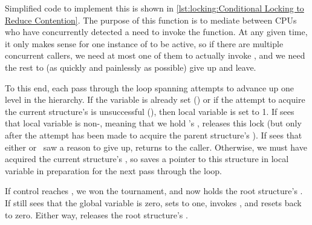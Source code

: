 Simplified code to implement this is shown in
\cref{lst:locking:Conditional Locking to Reduce Contention}.
The purpose of this function is to mediate between CPUs who have concurrently
detected a need to invoke the  function.
At any given time, it only makes sense for one instance of
 to be active, so if there are multiple
concurrent callers, we need at most one of them to actually invoke
, and we need the rest to (as quickly and
painlessly as possible) give up and leave.

\begin{fcvref}
To this end, each pass through the loop spanning  attempts
to advance up one level in the  hierarchy.
If the  variable is already set () or if the attempt
to acquire the current  structure's  is
unsuccessful (), then local variable  is set to 1.
If  sees that local variable  is non-,
meaning that we hold 's ,
 releases this lock (but only after the attempt has been made
to acquire the parent  structure's ).
If  sees that either  or~
saw a reason to give up,
 returns to the caller.
Otherwise, we must have acquired the current  structure's
, so  saves a pointer to this structure in local
variable  in preparation for the next pass through the loop.

If control reaches , we won the tournament, and now holds the
root  structure's .
If  still sees that the global variable  is zero,
 sets  to one,  invokes
,
and  resets  back to zero.
Either way,  releases the root  structure's
.
\end{fcvref}

